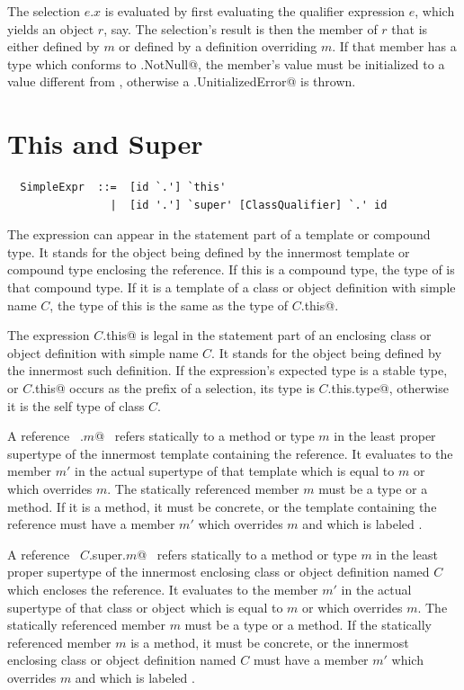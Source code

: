 The selection $e.x$ is evaluated by first evaluating the qualifier
expression $e$, which yields an object $r$, say. The selection's
result is then the member of $r$ that is either defined by $m$ or defined
by a definition overriding $m$. 
If that member has a type which
conforms to \lstinline@scala.NotNull@, the member's value must be initialized
to a value different from \lstinline@null@, otherwise a \lstinline@scala.UnitializedError@
is thrown.
 

\section{This and Super}
\label{sec:this-super}

\syntax\begin{lstlisting}
  SimpleExpr  ::=  [id `.'] `this'
                |  [id '.'] `super' [ClassQualifier] `.' id
\end{lstlisting}

The expression  can appear in the statement part of a
template or compound type. It stands for the object being defined by
the innermost template or compound type enclosing the reference. If
this is a compound type, the type of  is that compound type.
If it is a template of a
class or object definition with simple name $C$, the type of this
is the same as the type of \lstinline@$C$.this@.

The expression \lstinline@$C$.this@ is legal in the statement part of an
enclosing class or object definition with simple name $C$. It
stands for the object being defined by the innermost such definition.
If the expression's expected type is a stable type, or
\lstinline@$C$.this@ occurs as the prefix of a selection, its type is
\lstinline@$C$.this.type@, otherwise it is the self type of class $C$.

A reference ~\lstinline@super.$m$@~ refers statically to a method or type $m$
in the least proper supertype of the innermost template containing the
reference.  It evaluates to the member $m'$ in the actual supertype of
that template which is equal to $m$ or which overrides $m$.  The
statically referenced member $m$ must be a type or a
method. 
If it is
a method, it must be concrete, or the template
containing the reference must have a member $m'$ which overrides $m$
and which is labeled .  

A reference ~\lstinline@$C$.super.$m$@~ refers statically to a method
or type $m$ in the least proper supertype of the innermost enclosing class or
object definition named $C$ which encloses the reference. It evaluates
to the member $m'$ in the actual supertype of that class or object
which is equal to $m$ or which overrides $m$. The
statically referenced member $m$ must be a type or a
method.  If the statically
referenced member $m$ is a method, it must be concrete, or the innermost enclosing
class or object definition named $C$ must have a member $m'$ which
overrides $m$ and which is labeled .


